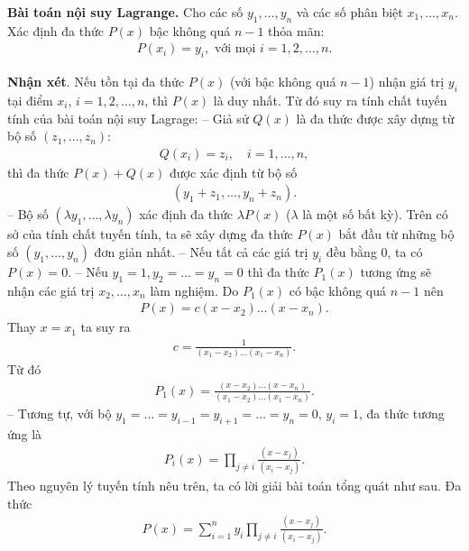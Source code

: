 \begin{multicols}{2}
	\begin{tBox}
		\textbf{\color{hoccungpi}Bài toán nội suy Lagrange.}
		Cho các số $y_1,\ldots, y_n$ và các số phân biệt $x_1,\ldots,x_n$. Xác định đa thức $P(x)$ bậc không quá $n-1$ thỏa mãn:
		\begin{align*}
			P(x_i)=y_i, \text{ với mọi } i=1,2,\ldots, n.
		\end{align*}
	\end{tBox}
	\textbf{\color{hoccungpi}Nhận xét}.
	Nếu tồn tại đa thức $P(x)$ (với bậc không quá $n-1$) nhận giá trị $y_i$ tại điểm $x_i$, 
	$i=1,2,\ldots, n$, thì $P(x)$ là duy nhất. 
	Từ đó suy ra {\color{blue} tính chất tuyến tính} của bài toán nội suy Lagrage:
	\vskip 0.1cm
	-- Giả sử $Q(x)$ là đa thức được xây dựng từ bộ số $(z_1,\ldots, z_n):$
	\begin{align*}
		Q(x_i)=z_i,\quad i=1,\ldots,n,
	\end{align*}
	thì đa thức $P(x)+Q(x)$ được xác định từ bộ số
	\begin{align*}
		(y_1+z_1,\ldots,y_n+z_n).
	\end{align*}
	-- Bộ số $(\lambda y_1,\ldots,\lambda y_n)$ xác định đa thức $\lambda P(x)$ ($\lambda$ là một số bất kỳ).  
	\vskip 0.1cm
	{\color{blue}Trên có sở của tính chất tuyến tính, ta sẽ xây dựng đa thức $P(x)$ bắt đầu từ những bộ số $(y_1,\ldots,y_n)$ đơn giản nhất.} 
	\vskip 0.1cm
	-- Nếu tất cả các giá trị $y_i$ đều bằng 0, ta có $P(x)=0$.
	\vskip 0.1cm  
	-- Nếu $y_1=1, y_2=\ldots=y_n=0$ thì đa thức $P_1(x)$ tương ứng sẽ nhận các giá trị  $x_2,\ldots,x_n$ làm nghiệm. Do $P_1(x)$ có bậc không quá $n-1$ nên  
	\begin{align*}
		P(x)=c(x-x_2)\ldots(x-x_n).
	\end{align*}
	Thay $x=x_1$ ta suy ra
	\begin{align*}
		c=\frac1{(x_1-x_2)\ldots(x_1-x_n)}.
	\end{align*}
	Từ đó
	\begin{align*}
		P_1(x)=\frac{ (x-x_2)\ldots(x-x_n)}{
			(x_1-x_2)\ldots(x_1-x_n)}.
	\end{align*}
	-- Tương tự, với bộ $y_1=\ldots=y_{i-1}=y_{i+1}=\ldots=y_n=0$, $y_i=1$,  đa thức tương ứng là 
	\begin{align*}
		P_i(x) =\prod_{j\neq i}\frac{(x-x_j)}{ (x_i-x_j)}.
	\end{align*}
	Theo nguyên lý tuyến tính nêu trên, ta có lời giải bài toán tổng quát như sau. Đa thức  
	\begin{align*}
		P(x)=\sum_{i=1}^n y_i\prod_{j\neq i}\frac{(x-x_j)}{ (x_i-x_j)}. \tag{$1$}

\end{align*}
\end{multicols}
